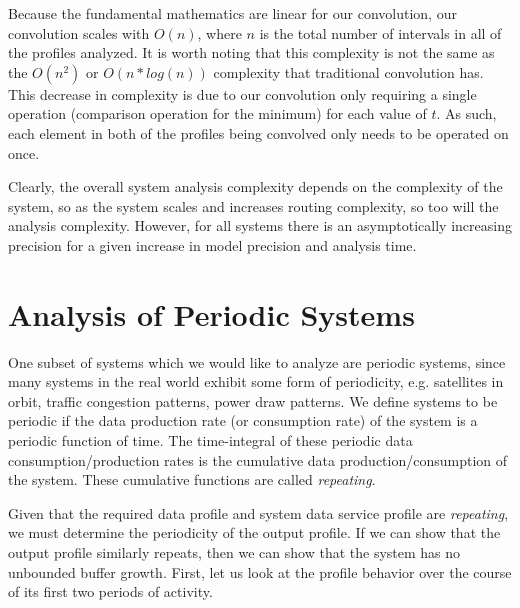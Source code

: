 Because the fundamental mathematics are linear for our convolution,
our convolution scales with $O(n)$, where $n$ is the total
number of intervals in all of the profiles analyzed.  It is worth
noting that this complexity is not the same as the $O(n^2)$ or
$O(n*log(n))$ complexity that traditional convolution has.  This
decrease in complexity is due to our convolution only requiring a
single operation (comparison operation for the minimum) for each value
of $t$.  As such, each element in both of the profiles being
convolved only needs to be operated on once.

Clearly, the overall system analysis complexity depends on the
complexity of the system, so as the system scales and increases
routing complexity, so too will the analysis complexity.  However, for
all systems there is an asymptotically increasing precision for a
given increase in model precision and analysis time.

\newpage

\section{Analysis of Periodic Systems}
\label{sec:periodic}

One subset of systems which we would like to analyze are periodic
systems, since many systems in the real world exhibit some form of
periodicity, e.g. satellites in orbit, traffic congestion patterns,
power draw patterns.  We define systems to be periodic if the data
production rate (or consumption rate) of the system is a periodic
function of time.  The time-integral of these periodic data
consumption/production rates is the cumulative data
production/consumption of the system.  These cumulative functions are
called \emph{repeating}.

Given that the required data profile and system data service profile
are \emph{repeating}, we must determine the periodicity of the output
profile.  If we can show that the output profile similarly repeats,
then we can show that the system has no unbounded buffer growth.
First, let us look at the profile behavior over the course of its
first two periods of activity.

